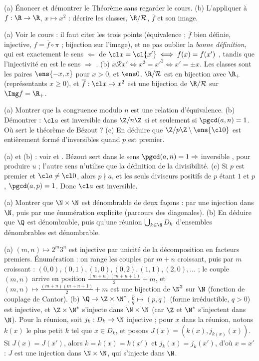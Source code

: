 \begin{exo}
(a) Énoncer et démontrer le Théorème  sans regarder le cours.
(b) L'appliquer à $f:\R\to\R$, $x\mapsto x^2$ : décrire les classes, $\R/\mathcal R$, $\overline f$ et son image.
\begin{corrige}
(a) Voir le cours : il faut citer les trois points (équivalence ; $\overline f$ bien définie, injective, $f=\overline f\circ\pi$ ; bijection sur l'image), et ne pas oublier la \emph{bonne définition}, qui est exactement le sens \og $\Leftarrow$ \fg{} de \og $\cl x=\cl{x'}\iff f(x)=f(x')$ \fg, tandis que l'injectivité en est le sens \og $\Rightarrow$ \fg.
(b) $x\mathcal R x'\iff x^2=x'^2\iff x'=\pm x$. Les classes sont les paires $\ens{-x,x}$ pour $x>0$, et $\ens0$. $\R/\mathcal R$ est en bijection avec $\R_+$ (représentants $x\ge0$), et $\overline f:\cl x\mapsto x^2$ est une bijection de $\R/\mathcal R$ sur $\Img f=\R_+$.
\end{corrige}
\end{exo}
\begin{exo}[S][Le Théorème 1.4.12]
(a) Montrer que la congruence modulo $n$ est une relation d'équivalence.
(b) Démontrer : $\cl a$ est inversible dans $\Z/n\Z$ si et seulement si $\pgcd(a,n)=1$. Où sert le théorème de Bézout ?
(c) En déduire que $\Z/p\Z\setminus\ens{\cl0}$ est entièrement formé d'inversibles quand $p$ est premier.
\begin{corrige}
(a) et (b) : voir  et . Bézout sert dans le sens \og $\pgcd(a,n)=1\Rightarrow$ inversible \fg, pour produire $u$ ; l'autre sens n'utilise que la définition de la divisibilité.
(c) Si $p$ est premier et $\cl a\neq\cl0$, alors $p\nmid a$, et les seuls diviseurs positifs de $p$ étant $1$ et $p$, $\pgcd(a,p)=1$. Donc $\cl a$ est inversible.
\end{corrige}
\end{exo}
\begin{exo}[A][Dénombrable]
(a) Montrer que $\N\times\N$ est dénombrable de deux façons : par une injection dans $\N$, puis par une énumération explicite (parcours des diagonales).
(b) En déduire que $\Q$ est dénombrable, puis qu'une réunion $\bigcup_{k\in\N}D_k$ d'ensembles dénombrables est dénombrable.
\begin{corrige}
(a) $(m,n)\mapsto2^m3^n$ est injective par unicité de la décomposition en facteurs premiers. Énumération : on range les couples par $m+n$ croissant, puis par $m$ croissant : $(0,0),(0,1),(1,0),(0,2),(1,1),(2,0),\dots$ ; le couple $(m,n)$ arrive en position $\frac{(m+n)(m+n+1)}2+m$, et $(m,n)\mapsto\frac{(m+n)(m+n+1)}2+m$ est une bijection de $\N^2$ sur $\N$ (fonction de couplage de Cantor).
(b) $\Q\to\Z\times\N^*$, $\frac pq\mapsto(p,q)$ (forme irréductible, $q>0$) est injective, et $\Z\times\N^*$ s'injecte dans $\N\times\N$ (car $\Z$ et $\N^*$ s'injectent dans $\N$). Pour la réunion, soit $j_k:D_k\to\N$ injective ; pour $x$ dans la réunion, notons $k(x)$ le plus petit $k$ tel que $x\in D_k$, et posons $J(x)=(k(x),j_{k(x)}(x))$. Si $J(x)=J(x')$, alors $k=k(x)=k(x')$ et $j_k(x)=j_k(x')$, d'où $x=x'$ : $J$ est une injection dans $\N\times\N$, qui s'injecte dans $\N$.
\end{corrige}
\end{exo}
